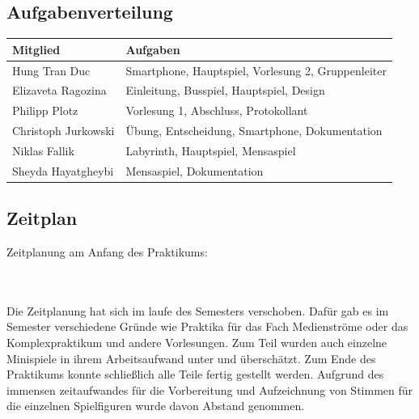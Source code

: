 \documentclass[a4paper, 11pt]{article} %
\begin{document}
\subsection{Aufgabenverteilung}
\begin{tabular}{|lp{9.0cm}|}
\hline 
\textbf{Mitglied} & \textbf{Aufgaben} \\ 
\hline 
Hung Tran Duc & Smartphone, Hauptspiel, Vorlesung 2, Gruppenleiter  \\ 
\hline
Elizaveta Ragozina & Einleitung, Busspiel, Hauptspiel, Design \\ 
\hline
Philipp Plotz & Vorlesung 1, Abschluss, Protokollant \\ 
\hline
Christoph Jurkowski & Übung, Entscheidung, Smartphone, Dokumentation \\ 
\hline
Niklas Fallik & Labyrinth, Hauptspiel, Mensaspiel \\ 
\hline
Sheyda Hayatgheybi & Mensaspiel, Dokumentation \\ 
\hline

\end{tabular} 

\subsection{Zeitplan}
Zeitplanung am Anfang des Praktikums:
\begin{figure}[ht]
\end{figure} \\\\
Die Zeitplanung hat sich im laufe des Semesters verschoben. Dafür gab es im Semester verschiedene Gründe wie Praktika für das Fach Medienströme oder das Komplexpraktikum und andere Vorlesungen. Zum Teil wurden auch einzelne Minispiele in ihrem Arbeitsaufwand unter und überschätzt. Zum Ende des Praktikums konnte schließlich alle Teile fertig gestellt werden. Aufgrund des immensen zeitaufwandes für die Vorbereitung und Aufzeichnung von Stimmen für die einzelnen Spielfiguren wurde davon Abstand genommen.
\end{document}
